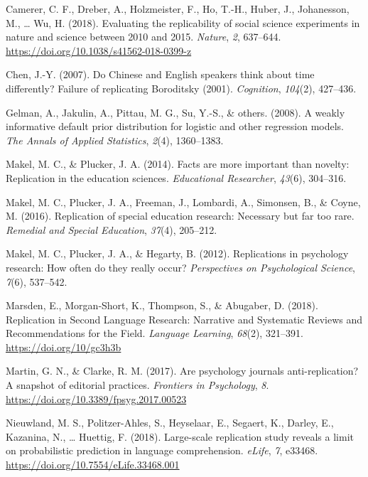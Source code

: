 \documentclass[
  english,
  man]{apa6}
\begin{document}
\leavevmode\hypertarget{ref-camerer_socscience_2018}{}%
Camerer, C. F., Dreber, A., Holzmeister, F., Ho, T.-H., Huber, J., Johanesson, M., \ldots{} Wu, H. (2018). Evaluating the replicability of social science experiments in nature and science between 2010 and 2015. \emph{Nature}, \emph{2}, 637--644. \url{https://doi.org/10.1038/s41562-018-0399-z}

\leavevmode\hypertarget{ref-chen_chinese_2007}{}%
Chen, J.-Y. (2007). Do Chinese and English speakers think about time differently? Failure of replicating Boroditsky (2001). \emph{Cognition}, \emph{104}(2), 427--436.

\leavevmode\hypertarget{ref-gelman_weakly_2008}{}%
Gelman, A., Jakulin, A., Pittau, M. G., Su, Y.-S., \& others. (2008). A weakly informative default prior distribution for logistic and other regression models. \emph{The Annals of Applied Statistics}, \emph{2}(4), 1360--1383.

\leavevmode\hypertarget{ref-makel2014facts}{}%
Makel, M. C., \& Plucker, J. A. (2014). Facts are more important than novelty: Replication in the education sciences. \emph{Educational Researcher}, \emph{43}(6), 304--316.

\leavevmode\hypertarget{ref-makel_replications_2016}{}%
Makel, M. C., Plucker, J. A., Freeman, J., Lombardi, A., Simonsen, B., \& Coyne, M. (2016). Replication of special education research: Necessary but far too rare. \emph{Remedial and Special Education}, \emph{37}(4), 205--212.

\leavevmode\hypertarget{ref-makel_replications_2012}{}%
Makel, M. C., Plucker, J. A., \& Hegarty, B. (2012). Replications in psychology research: How often do they really occur? \emph{Perspectives on Psychological Science}, \emph{7}(6), 537--542.

\leavevmode\hypertarget{ref-marsden_replication_2018}{}%
Marsden, E., Morgan‐Short, K., Thompson, S., \& Abugaber, D. (2018). Replication in Second Language Research: Narrative and Systematic Reviews and Recommendations for the Field. \emph{Language Learning}, \emph{68}(2), 321--391. \url{https://doi.org/10/gc3h3b}

\leavevmode\hypertarget{ref-martinclarke_policies_2017}{}%
Martin, G. N., \& Clarke, R. M. (2017). Are psychology journals anti-replication? A snapshot of editorial practices. \emph{Frontiers in Psychology}, \emph{8}. \url{https://doi.org/10.3389/fpsyg.2017.00523}

\leavevmode\hypertarget{ref-nieuwland_large-scale_2018}{}%
Nieuwland, M. S., Politzer-Ahles, S., Heyselaar, E., Segaert, K., Darley, E., Kazanina, N., \ldots{} Huettig, F. (2018). Large-scale replication study reveals a limit on probabilistic prediction in language comprehension. \emph{eLife}, \emph{7}, e33468. \url{https://doi.org/10.7554/eLife.33468.001}
\end{document}
